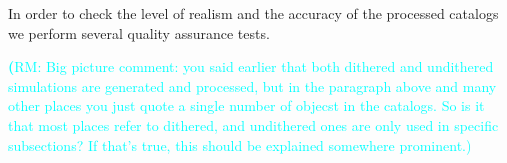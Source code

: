 \documentclass[twocolumn]{aastex62}
\newcommand{\rachel}[1]{{\textcolor{cyan}{{\textbf (RM: #1)}}}}
\begin{document}
In order to check the level of realism and the accuracy of the processed catalogs we perform several quality assurance tests.

\rachel{Big picture comment: you said earlier that both dithered and undithered simulations are generated and processed, but in the paragraph above and many other places you just quote a single number of objecst in the catalogs.  So is it that most places refer to dithered, and undithered ones are only used in specific subsections?  If that's true, this should be explained somewhere prominent.}



\end{document}
